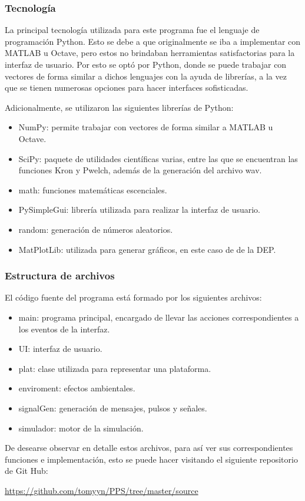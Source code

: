 \documentclass[a4paper,10pt]{article}
\begin{document}
\subsubsection{Tecnología}
La principal tecnología utilizada para este programa fue el lenguaje de programación Python. Esto se debe a que originalmente se iba a implementar con MATLAB u Octave, pero estos no brindaban herramientas satisfactorias para la interfaz de usuario. Por esto se optó por
Python, donde se puede trabajar con vectores de forma similar a dichos lenguajes con la ayuda de librerías, a la vez que se tienen numerosas opciones para hacer interfaces sofisticadas.
\par
Adicionalmente, se utilizaron las siguientes librerías de Python:
\begin{itemize}
\item NumPy: permite trabajar con vectores de forma similar a MATLAB u Octave.
\item SciPy: paquete de utilidades científicas varias, entre las que se encuentran las funciones Kron y Pwelch, además de la generación del archivo wav.
\item math: funciones matemáticas escenciales.
\item PySimpleGui: librería utilizada para realizar la interfaz de usuario.
\item random: generación de números aleatorios.
\item MatPlotLib: utilizada para generar gráficos, en este caso de de la DEP.
\end{itemize}

\subsubsection{Estructura de archivos}
El código fuente del programa  está formado por los siguientes archivos:
\begin{itemize}
\item main: programa principal, encargado de llevar las acciones correspondientes a los eventos de la interfaz.
\item UI: interfaz de usuario.
\item plat: clase utilizada para representar una plataforma.
\item enviroment: efectos ambientales.
\item signalGen: generación de mensajes, pulsos y señales.
\item simulador: motor de la simulación.
\end{itemize}
De desearse observar en detalle estos archivos, para así ver sus correspondientes funciones e implementación, esto se puede hacer visitando el siguiente  repositorio de Git Hub: 
\par
\textcolor{blue}{\url{https://github.com/tomyyn/PPS/tree/master/source}}
\end{document}

